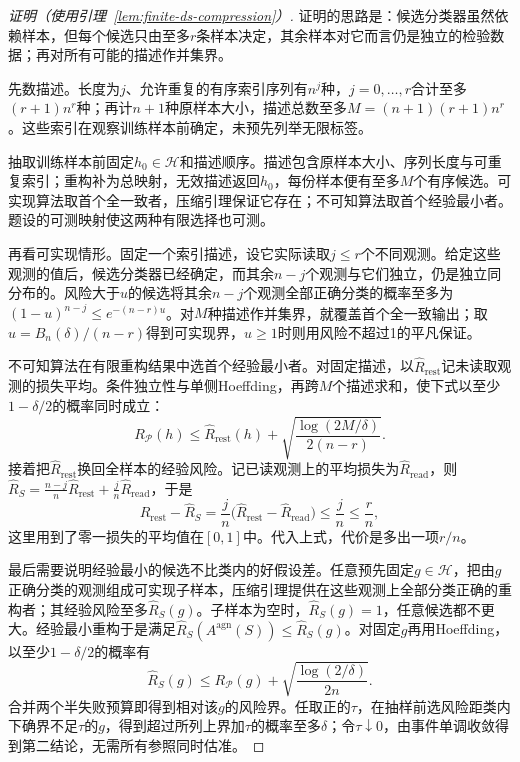 \begin{proof}[证明（使用引理~\ref{lem:finite-ds-compression}）]
证明的思路是：候选分类器虽然依赖样本，但每个候选只由至多$r$条样本决定，其余样本对它而言仍是独立的检验数据；再对所有可能的描述作并集界。

先数描述。长度为$j$、允许重复的有序索引序列有$n^j$种，$j=0,\ldots,r$合计至多$(r+1)n^r$种；再计$n+1$种原样本大小，描述总数至多$M=(n+1)(r+1)n^r$。这些索引在观察训练样本前确定，未预先列举无限标签。

抽取训练样本前固定$h_0\in\mathcal H$和描述顺序。描述包含原样本大小、序列长度与可重复索引；重构补为总映射，无效描述返回$h_0$，每份样本便有至多$M$个有序候选。可实现算法取首个全一致者，压缩引理保证它存在；不可知算法取首个经验最小者。题设的可测映射使这两种有限选择也可测。

再看可实现情形。固定一个索引描述，设它实际读取$j\leq r$个不同观测。给定这些观测的值后，候选分类器已经确定，而其余$n-j$个观测与它们独立，仍是独立同分布的。风险大于$u$的候选将其余$n-j$个观测全部正确分类的概率至多为$(1-u)^{n-j}\leq e^{-(n-r)u}$。对$M$种描述作并集界，就覆盖首个全一致输出；取$u=B_n(\delta)/(n-r)$得到可实现界，$u\geq1$时则用风险不超过1的平凡保证。

不可知算法在有限重构结果中选首个经验最小者。对固定描述，以$\hat R_{\mathrm{rest}}$记未读取观测的损失平均。条件独立性与单侧Hoeffding，再跨$M$个描述求和，使下式以至少$1-\delta/2$的概率同时成立：
\[
 R_{\mathcal P}(h)\leq\hat R_{\mathrm{rest}}(h)
       +\sqrt{\frac{\log(2M/\delta)}{2(n-r)}}.
\]
接着把$\hat R_{\mathrm{rest}}$换回全样本的经验风险。记已读观测上的平均损失为$\hat R_{\mathrm{read}}$，则$\hat R_S=\frac{n-j}n\hat R_{\mathrm{rest}}+\frac jn\hat R_{\mathrm{read}}$，于是
\[
 \hat R_{\mathrm{rest}}-\hat R_S=\frac jn\bigl(\hat R_{\mathrm{rest}}-\hat R_{\mathrm{read}}\bigr)\leq\frac jn\leq\frac rn,
\]
这里用到了零一损失的平均值在$[0,1]$中。代入上式，代价是多出一项$r/n$。

最后需要说明经验最小的候选不比类内的好假设差。任意预先固定$g\in\mathcal H$，把由$g$正确分类的观测组成可实现子样本，压缩引理提供在这些观测上全部分类正确的重构者；其经验风险至多$\hat R_S(g)$。子样本为空时，$\hat R_S(g)=1$，任意候选都不更大。经验最小重构于是满足$\hat R_S(A^{\mathrm{agn}}(S))\leq\hat R_S(g)$。对固定$g$再用Hoeffding，以至少$1-\delta/2$的概率有
\[
 \hat R_S(g)\leq R_{\mathcal P}(g)
       +\sqrt{\frac{\log(2/\delta)}{2n}}.
\]
合并两个半失败预算即得到相对该$g$的风险界。任取正的$\tau$，在抽样前选风险距类内下确界不足$\tau$的$g$，得到超过所列上界加$\tau$的概率至多$\delta$；令$\tau\downarrow0$，由事件单调收敛得到第二结论，无需所有参照同时估准。
\end{proof}

